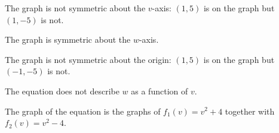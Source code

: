 \begin{enumerate}
\begin{flushleft}
The graph is not symmetric about the $v$-axis:  $(1,5)$ is on the graph but $(1,-5)$ is not.

The graph is  symmetric about the $w$-axis. 

The graph is not symmetric about the origin: $(1,5)$ is on the graph but $(-1, -5)$ is not.  

The equation does not describe $w$ as a function of $v$.  

The graph of the equation is the graphs of $f_{1}(v) = v^2+4$ together with $f_{2}(v) = v^2-4$.

\end{flushleft}

\setcounter{HW}{\value{enumi}}
\end{enumerate}

